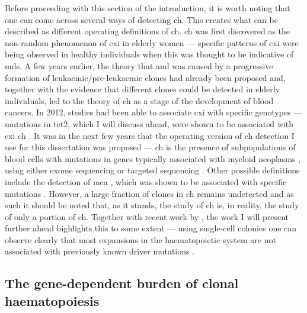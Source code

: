 Before proceeding with this section of the introduction, it is worth noting that one can come across several ways of detecting \ac{ch}. This creates what can be described as different operating definitions of \ac{ch}. \ac{ch} was first discovered as the non-random phenomenon of \ac{cxi} in elderly women \cite{Busque1996-ek,Champion1997-fj} --- specific patterns of \ac{cxi} were being observed in healthy individuals when this was thought to be indicative of \ac{mds}. A few years earlier, the theory that \ac{aml} was caused by a progressive formation of leukaemic/pre-leukaemic clones had already been proposed \cite{Fialkow1991-de} and, together with the evidence that different clones could be detected in elderly individuals, led to the theory of \ac{ch} as a stage of the development of blood cancers. In 2012, studies had been able to associate \ac{cxi} with specific genotypes --- mutations in \ac{tet2}, which I will discuss ahead, were shown to be associated with \ac{cxi} \ac{ch} \cite{Busque2012-oc}. It was in the next few years that the operating version of \ac{ch} detection I use for this dissertation was proposed --- \ac{ch} is the presence of subpopulations of blood cells with mutations in genes typically associated with myeloid neoplasms \cite{Jaiswal2014-rl,Genovese2014-eu,Xie2014-np,McKerrell2015-rl}, using either exome sequencing \cite{Xie2014-np,Jaiswal2014-rl,Genovese2014-eu} or targeted sequencing \cite{McKerrell2015-rl}. Other possible definitions include the detection of \ac{mca} \cite{Jacobs2012-cj,Laurie2012-fc,Loh2018-xp,Gao2021-ph}, which was shown to be associated with specific mutations \cite{Loh2018-xp,Gao2021-ph}. However, a large fraction of clones in \ac{ch} remains undetected \cite{Poon2020-hl,Genovese2014-eu,Zink2017-zi} and as such it should be noted that, as it stands, the study of \ac{ch} is, in reality, the study of only a portion of \ac{ch}. Together with recent work by , the work I will present further ahead highlights this to some extent --- using single-cell colonies one can observe clearly that most expansions in the haematopoietic system are not associated with previously known driver mutations \cite{Fabre2021-uw,Mitchell2021-zl}. 

\subsection{The gene-dependent burden of clonal haematopoiesis}

